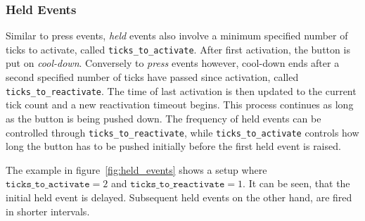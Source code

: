 \subsubsection{Held Events}\label{sec:held_events}

Similar to press events, \emph{held} events also involve a minimum specified number of ticks to activate, called \texttt{ticks\_to\_activate}. After first activation, the button is put on \emph{cool-down}. Conversely to \emph{press} events however, cool-down ends after a second specified number of ticks have passed since activation, called \texttt{ticks\_to\_reactivate}. The time of last activation is then updated to the current tick count and a new reactivation timeout begins. This process continues as long as the button is being pushed down. The frequency of held events can be controlled through \texttt{ticks\_to\_reactivate}, while \texttt{ticks\_to\_activate} controls how long the button has to be pushed initially before the first held event is raised.

The example in figure~\ref{fig:held_events} shows a setup where \(\texttt{ticks\_to\_activate} = 2\) and \linebreak[4] \(\texttt{ticks\_to\_reactivate} = 1\). It can be seen, that the initial held event is delayed. Subsequent held events on the other hand, are fired in shorter intervals.

